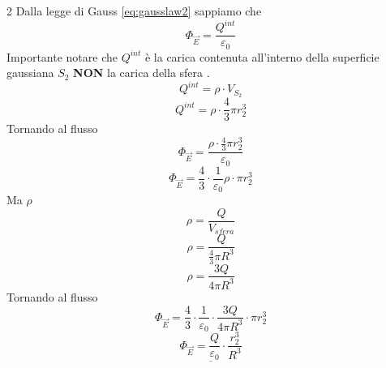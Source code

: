 \documentclass[twoside]{article}
\begin{document}
\begin{itemize}
\begin{multicols}{2}
              Dalla legge di Gauss \ref{eq:gausslaw2} sappiamo che
              \begin{equation*}
                  \Phi_{\vec{E}} = \displaystyle \frac{Q^{int}}{\varepsilon_0}
              \end{equation*}
              Importante notare che $Q^{int}$ è la carica contenuta all'interno della superficie gaussiana $S_2$ \textbf{NON} la carica della sfera .\\
              \begin{equation*}
                  Q^{int} = \rho \cdot V_{S_2}
              \end{equation*}
              \begin{equation*}
                  Q^{int} = \rho \cdot \frac{4}{3} \pi r_{2}^3
              \end{equation*}
              Tornando al flusso
              \begin{equation*}
                  \Phi_{\vec{E}} = \displaystyle \frac{\rho \cdot \frac{4}{3} \pi r_{2}^3}{\varepsilon_0}
              \end{equation*}
              \begin{equation*}
                  \Phi_{\vec{E}} = \displaystyle \frac{4}{3} \cdot \frac{1}{\varepsilon_0} \rho \cdot  \pi r_{2}^3
              \end{equation*}
              Ma $\rho$
              \begin{equation*}
                  \rho = \displaystyle \frac{Q}{V_{sfera}}
              \end{equation*}
              \begin{equation*}
                  \rho = \displaystyle \frac{Q}{\frac{4}{3} \pi R^3}
              \end{equation*}
              \begin{equation*}
                  \rho = \displaystyle \frac{3Q}{4 \pi R^3}
              \end{equation*}
              Tornando al flusso
              \begin{equation*}
                  \Phi_{\vec{E}} = \displaystyle \frac{4}{3} \cdot \frac{1}{\varepsilon_0} \cdot \frac{3Q}{4 \pi R^3} \cdot  \pi r_{2}^3
              \end{equation*}
              \begin{equation*}
                  \underline{\Phi_{\vec{E}} = \displaystyle \frac{Q}{\varepsilon_0} \cdot \frac{r_{2}^3}{R^3}}
              \end{equation*}

\end{multicols}
\end{itemize}
\end{document}
